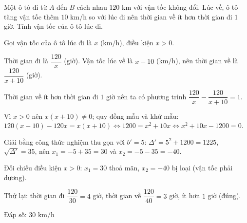 \begin{problem}[9DS-PT2-010]
Một ô tô đi từ $A$ đến $B$ cách nhau $120$ km với vận tốc không đổi. Lúc về, ô tô tăng vận tốc thêm $10$ km/h so với lúc đi nên thời gian về ít hơn thời gian đi $1$ giờ. Tính vận tốc của ô tô lúc đi.

\begin{solution}
Gọi vận tốc của ô tô lúc đi là $x$ (km/h), điều kiện $x > 0$.

Thời gian đi là $\dfrac{120}{x}$ (giờ). Vận tốc lúc về là $x + 10$ (km/h), nên thời gian về là $\dfrac{120}{x + 10}$ (giờ).

Thời gian về ít hơn thời gian đi $1$ giờ nên ta có phương trình $\dfrac{120}{x} - \dfrac{120}{x + 10} = 1$.

Vì $x > 0$ nên $x(x + 10) \neq 0$; quy đồng mẫu và khử mẫu: $120(x + 10) - 120x = x(x + 10) \Leftrightarrow 1200 = x^2 + 10x \Leftrightarrow x^2 + 10x - 1200 = 0$.

Giải bằng công thức nghiệm thu gọn với $b' = 5$: $\Delta' = 5^2 + 1200 = 1225$, $\sqrt{\Delta'} = 35$, nên $x_1 = -5 + 35 = 30$ và $x_2 = -5 - 35 = -40$.

Đối chiếu điều kiện $x > 0$: $x_1 = 30$ thoả mãn, $x_2 = -40$ bị loại (vận tốc phải dương).

Thử lại: thời gian đi $\dfrac{120}{30} = 4$ giờ, thời gian về $\dfrac{120}{40} = 3$ giờ, ít hơn $1$ giờ (đúng).

Đáp số: $\boxed{30 \text{ km/h}}$
\end{solution}
\end{problem}

